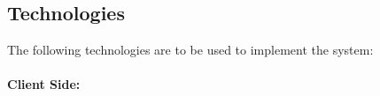 \subsection{Technologies}
The following technologies are to be used to implement the system:\\ \\
{\bfseries Client Side:}